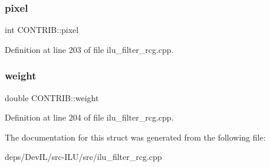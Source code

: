 \subsubsection{\texorpdfstring{pixel}{pixel}}
{\footnotesize\ttfamily int C\+O\+N\+T\+R\+I\+B\+::pixel}



Definition at line 203 of file ilu\+\_\+filter\+\_\+rcg.\+cpp.

\mbox{\label{structCONTRIB_a60106e6aef9c3593fac57bde6e9e0db3}} 
\subsubsection{\texorpdfstring{weight}{weight}}
{\footnotesize\ttfamily double C\+O\+N\+T\+R\+I\+B\+::weight}



Definition at line 204 of file ilu\+\_\+filter\+\_\+rcg.\+cpp.



The documentation for this struct was generated from the following file\+:\begin{DoxyCompactItemize}
\item 
deps/\+Dev\+I\+L/src-\/\+I\+L\+U/src/ilu\+\_\+filter\+\_\+rcg.\+cpp\end{DoxyCompactItemize}
